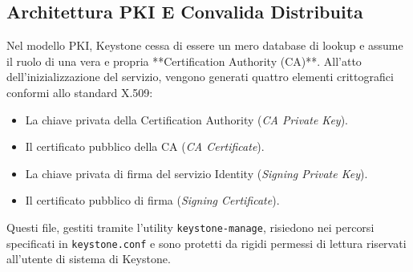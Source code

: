 \documentclass[11pt, a4paper]{article}
\begin{document}
\subsection{Architettura PKI E Convalida Distribuita}

Nel modello PKI, Keystone cessa di essere un mero database di lookup e assume il ruolo di una vera e propria **Certification Authority (CA)**. All'atto dell'inizializzazione del servizio, vengono generati quattro elementi crittografici conformi allo standard X.509:
\begin{itemize}[noitemsep]
    \item La chiave privata della Certification Authority (\emph{CA Private Key}).
    \item Il certificato pubblico della CA (\emph{CA Certificate}).
    \item La chiave privata di firma del servizio Identity (\emph{Signing Private Key}).
    \item Il certificato pubblico di firma (\emph{Signing Certificate}).
\end{itemize}

Questi file, gestiti tramite l'utility \texttt{keystone-manage}, risiedono nei percorsi specificati in \texttt{keystone.conf} e sono protetti da rigidi permessi di lettura riservati all'utente di sistema di Keystone.

\usetikzlibrary{positioning, shapes.geometric, arrows.meta}
\end{document}
